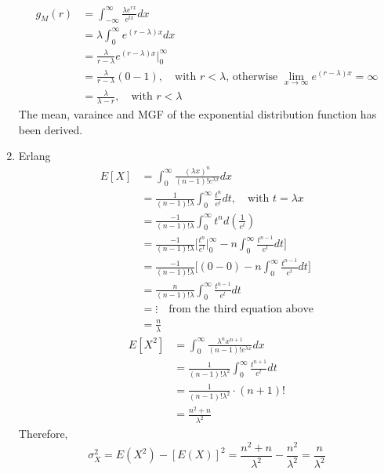 \documentclass[UTF8]{article}
\begin{document}
\begin{enumerate}
        \begin{equation*}
          \begin{split}
             g_M(r) & =\int_{-\infty}^{\infty}\frac{\lambda e^{rx}}{e^{tx}}dx \\
               & =\lambda\int_{0}^{\infty}e^{(r-\lambda)x}dx\\
               & =\frac{\lambda}{r-\lambda}e^{(r-\lambda)x}\big|^\infty_0\\
               &=\frac{\lambda}{r-\lambda}(0-1),\quad\text{with $r<\lambda$, otherwise $\lim_{x\rightarrow\infty}e^{(r-\lambda)x}=\infty$}\\
               &=\frac{\lambda}{\lambda-r},\quad\text{with $r<\lambda$}
          \end{split}
        \end{equation*}
        The mean, varaince and MGF of the exponential distribution function has been derived.
        \item Erlang
            \begin{equation*}
                \begin{split}
                    E[X] &=\int_{0}^\infty\frac{(\lambda x)^{n}}{(n-1)!e^{\lambda x}}dx\\
                    &=\frac{1}{(n-1)!\lambda}\int_0^\infty\frac{t^n}{e^t}dt,\quad\text{with $t=\lambda x$}\\
                    &=\frac{-1}{(n-1)!\lambda}\int_0^\infty t^nd(\frac{1}{e^t})\\
                    &=\frac{-1}{(n-1)!\lambda}\bigg[\frac{t^n}{e^t}\bigg|^\infty_0-n\int^\infty_0\frac{t^{n-1}}{e^t}dt\bigg]\\
                    &=\frac{-1}{(n-1)!\lambda}\bigg[(0-0)-n\int^\infty_0\frac{t^{n-1}}{e^t}dt\bigg]\\
                    &=\frac{n}{(n-1)!\lambda}\int^\infty_0\frac{t^{n-1}}{e^t}dt\\
                    &=\vdots\quad\text{from the third equation above}\\
                    &=\frac{n}{\lambda}
                \end{split}
            \end{equation*}
            \begin{equation*}
                \begin{split}
                    E[X^2] &= \int^\infty_{0}\frac{\lambda^nx^{n+1}}{(n-1)!e^{\lambda x}}dx\\
                    &= \frac{1}{(n-1)!\lambda^2}\int_0^\infty\frac{t^{n+1}}{e^t}dt\\
                    &= \frac{1}{(n-1)!\lambda^2}\cdot(n+1)!\\
                    &= \frac{n^2+n}{\lambda^2}
                \end{split}
            \end{equation*}
            Therefore, 
            \begin{equation*}
                \sigma^2_X=E(X^2)-[E(X)]^2=\frac{n^2+n}{\lambda^2}-\frac{n^2}{\lambda^2}=\frac{n}{\lambda^2}
            \end{equation*}


\end{enumerate}
\end{document}

